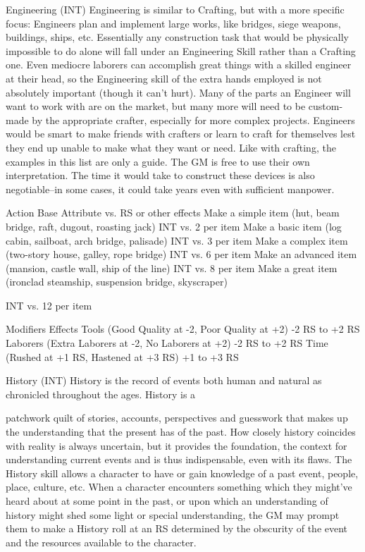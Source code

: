 \documentclass[oneside,11pt,english]{book}
\begin{document}
 

 

 

Engineering (INT) 
Engineering is similar to Crafting, but with a more specific focus: Engineers plan and implement large 
works, like bridges, siege weapons, buildings, ships, etc. Essentially any construction task that would be 
physically impossible to do alone will fall under an Engineering Skill rather than a Crafting one. 
Even mediocre laborers can accomplish great things with a skilled engineer at their head, so the 
Engineering skill of the extra hands employed is not absolutely important (though it can’t hurt). 
Many of the parts an Engineer will want to work with are on the market, but many more will need to be 
custom-made by the appropriate crafter, especially for more complex projects. Engineers would be smart 
to make friends with crafters or learn to craft for themselves lest they end up unable to make what they 
want or need. 
Like with crafting, the examples in this list are only a guide. The GM is free to use their own 
interpretation. The time it would take to construct these devices is also negotiable--in some cases, it could 
take years even with sufficient manpower. 

 

Action Base Attribute vs. RS or other 
effects 
Make a simple item (hut, beam bridge, raft, dugout, roasting jack) INT vs. 2 per item 
Make a basic item (log cabin, sailboat, arch bridge, palisade) INT vs. 3 per item 
Make a complex item (two-story house, galley, rope bridge) INT vs. 6 per item 
Make an advanced item (mansion, castle wall, ship of the line) INT vs. 8 per item 
Make a great item (ironclad steamship, suspension bridge, 
skyscraper) 

INT vs. 12 per item 

Modifiers Effects 
Tools (Good Quality at -2, Poor Quality at +2) -2 RS to +2 RS 
Laborers (Extra Laborers at -2, No Laborers at +2) -2 RS to +2 RS 
Time (Rushed at +1 RS, Hastened at +3 RS) +1 to +3 RS 

 

 

History (INT) 
History is the record of events both human and natural as chronicled throughout the ages. History is a 


patchwork quilt of stories, accounts, perspectives and guesswork that makes up the understanding that the 
present has of the past. How closely history coincides with reality is always uncertain, but it provides the 
foundation, the context for understanding current events and is thus indispensable, even with its flaws. 
The History skill allows a character to have or gain knowledge of a past event, people, place, culture, etc. 
When a character encounters something which they might’ve heard about at some point in the past, or 
upon which an understanding of history might shed some light or special understanding, the GM may 
prompt them to make a History roll at an RS determined by the obscurity of the event and the resources 
available to the character. 
\end{document}
